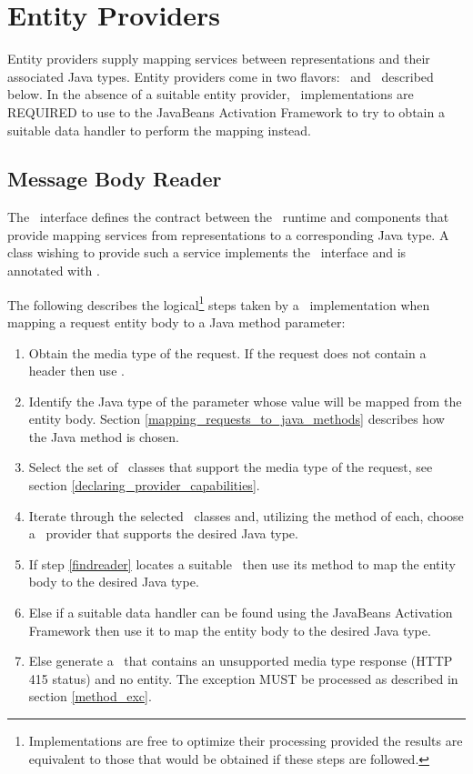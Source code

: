 \section{Entity Providers}
\label{entity_providers}

Entity providers supply mapping services between representations and their associated Java types. Entity providers come in two flavors: \MsgRead\ and \MsgWrite\ described below. In the absence of a suitable entity provider, \jaxrs\ implementations are REQUIRED to use to the JavaBeans Activation Framework\cite{jaf} to try to obtain a suitable data handler to perform the mapping instead.

\subsection{Message Body Reader}
\label{message_body_reader}

The \MsgRead\ interface defines the contract between the \jaxrs\ runtime and components that provide mapping services from representations to a corresponding Java type. A class wishing to provide such a service implements the \MsgRead\ interface and is annotated with \Provider.

The following describes the logical\footnote{Implementations are free to optimize their processing provided the results are equivalent to those that would be obtained if these steps are followed.} steps taken by a \jaxrs\ implementation when mapping a request entity body to a Java method parameter:

\begin{enumerate}
\item Obtain the media type of the request. If the request does not contain a  header then use .
\item Identify the Java type of the parameter whose value will be mapped from the entity body. Section \ref{mapping_requests_to_java_methods} describes how the Java method is chosen.
\item Select the set of \MsgRead\ classes that support the media type of the request, see section \ref{declaring_provider_capabilities}.
\item\label{findreader} Iterate through the selected \MsgRead\ classes and, utilizing the  method of each, choose a \MsgRead\ provider that supports the desired Java type.
\item If step \ref{findreader} locates a suitable \MsgRead\ then use its  method to map the entity body to the desired Java type.
\item Else if a suitable data handler can be found using the JavaBeans Activation Framework\cite{jaf} then use it to map the entity body to the desired Java type.
\item Else generate a \WebAppExc\ that contains an unsupported media type response (HTTP 415 status) and no entity. The exception MUST be processed as described in section \ref{method_exc}.
\end{enumerate}


